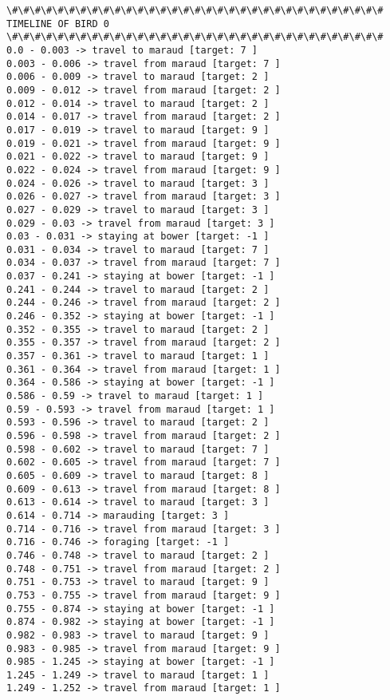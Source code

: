 \documentclass[11pt]{article}
\begin{document}
    \begin{Verbatim}[commandchars=\\\{\}]
\#\#\#\#\#\#\#\#\#\#\#\#\#\#\#\#\#\#\#\#\#\#\#\#\#\#\#\#\#\#\#\#\#
TIMELINE OF BIRD 0
\#\#\#\#\#\#\#\#\#\#\#\#\#\#\#\#\#\#\#\#\#\#\#\#\#\#\#\#\#\#\#\#\#
0.0 - 0.003 -> travel to maraud [target: 7 ]
0.003 - 0.006 -> travel from maraud [target: 7 ]
0.006 - 0.009 -> travel to maraud [target: 2 ]
0.009 - 0.012 -> travel from maraud [target: 2 ]
0.012 - 0.014 -> travel to maraud [target: 2 ]
0.014 - 0.017 -> travel from maraud [target: 2 ]
0.017 - 0.019 -> travel to maraud [target: 9 ]
0.019 - 0.021 -> travel from maraud [target: 9 ]
0.021 - 0.022 -> travel to maraud [target: 9 ]
0.022 - 0.024 -> travel from maraud [target: 9 ]
0.024 - 0.026 -> travel to maraud [target: 3 ]
0.026 - 0.027 -> travel from maraud [target: 3 ]
0.027 - 0.029 -> travel to maraud [target: 3 ]
0.029 - 0.03 -> travel from maraud [target: 3 ]
0.03 - 0.031 -> staying at bower [target: -1 ]
0.031 - 0.034 -> travel to maraud [target: 7 ]
0.034 - 0.037 -> travel from maraud [target: 7 ]
0.037 - 0.241 -> staying at bower [target: -1 ]
0.241 - 0.244 -> travel to maraud [target: 2 ]
0.244 - 0.246 -> travel from maraud [target: 2 ]
0.246 - 0.352 -> staying at bower [target: -1 ]
0.352 - 0.355 -> travel to maraud [target: 2 ]
0.355 - 0.357 -> travel from maraud [target: 2 ]
0.357 - 0.361 -> travel to maraud [target: 1 ]
0.361 - 0.364 -> travel from maraud [target: 1 ]
0.364 - 0.586 -> staying at bower [target: -1 ]
0.586 - 0.59 -> travel to maraud [target: 1 ]
0.59 - 0.593 -> travel from maraud [target: 1 ]
0.593 - 0.596 -> travel to maraud [target: 2 ]
0.596 - 0.598 -> travel from maraud [target: 2 ]
0.598 - 0.602 -> travel to maraud [target: 7 ]
0.602 - 0.605 -> travel from maraud [target: 7 ]
0.605 - 0.609 -> travel to maraud [target: 8 ]
0.609 - 0.613 -> travel from maraud [target: 8 ]
0.613 - 0.614 -> travel to maraud [target: 3 ]
0.614 - 0.714 -> marauding [target: 3 ]
0.714 - 0.716 -> travel from maraud [target: 3 ]
0.716 - 0.746 -> foraging [target: -1 ]
0.746 - 0.748 -> travel to maraud [target: 2 ]
0.748 - 0.751 -> travel from maraud [target: 2 ]
0.751 - 0.753 -> travel to maraud [target: 9 ]
0.753 - 0.755 -> travel from maraud [target: 9 ]
0.755 - 0.874 -> staying at bower [target: -1 ]
0.874 - 0.982 -> staying at bower [target: -1 ]
0.982 - 0.983 -> travel to maraud [target: 9 ]
0.983 - 0.985 -> travel from maraud [target: 9 ]
0.985 - 1.245 -> staying at bower [target: -1 ]
1.245 - 1.249 -> travel to maraud [target: 1 ]
1.249 - 1.252 -> travel from maraud [target: 1 ]

\end{Verbatim}
\end{document}
